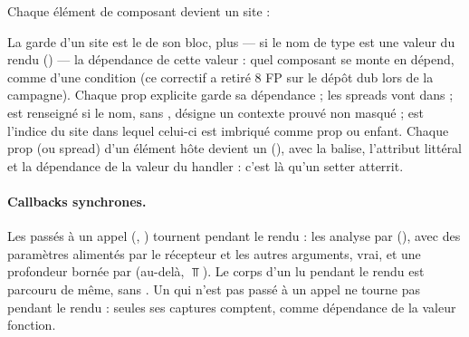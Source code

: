 Chaque élément de composant devient un site :



La garde d'un site est le  de son bloc, plus --- si le nom de type est une valeur du
rendu () --- la dépendance de cette valeur : quel
composant se monte en dépend, comme d'une condition (ce correctif a retiré 8 FP sur le dépôt dub
lors de la campagne). Chaque prop explicite garde sa dépendance ; les spreads vont dans
 ;  est renseigné si le nom, sans , désigne un
contexte prouvé non masqué ;  est l'indice du site dans lequel celui-ci est imbriqué
comme prop ou enfant. Chaque prop  (ou spread) d'un élément hôte devient un
 (), avec la balise, l'attribut
 littéral et la dépendance de la valeur du handler : c'est là qu'un setter
\og atterrit\fg.

\paragraph{Callbacks synchrones.} Les  passés à un appel (,
) tournent pendant le rendu :  les analyse par 
(), avec des paramètres alimentés par le récepteur et
les autres arguments,  vrai, et une profondeur bornée par 
(au-delà, $\Top$). Le corps d'un  lu pendant le rendu est parcouru de même, sans
. Un  qui n'est pas passé à un appel ne tourne pas pendant le rendu :
seules ses captures comptent, comme dépendance de la valeur fonction.

